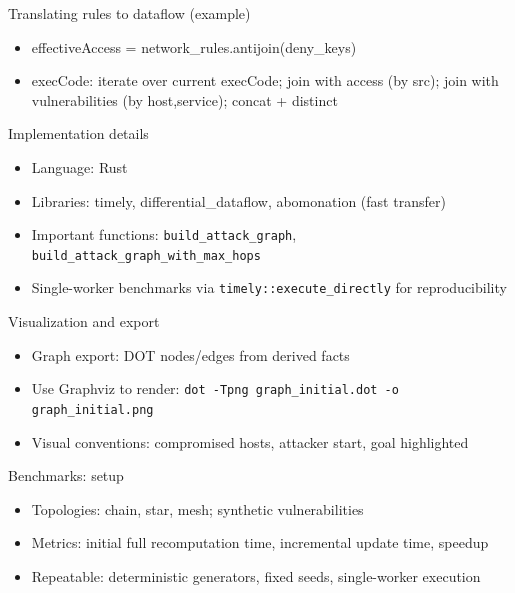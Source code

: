 \documentclass[professionalfonts]{beamer}
\begin{document}
\begin{frame}{Translating rules to dataflow (example)}
  \begin{itemize}
    \item effectiveAccess = network_rules.antijoin(deny_keys)
    \item execCode: iterate over current execCode; join with access (by src); join with vulnerabilities (by host,service); concat + distinct
  \end{itemize}
\end{frame}

\begin{frame}{Implementation details}
  \begin{itemize}
    \item Language: Rust
    \item Libraries: timely, differential_dataflow, abomonation (fast transfer)
    \item Important functions: \texttt{build_attack_graph}, \texttt{build_attack_graph_with_max_hops}
    \item Single-worker benchmarks via \texttt{timely::execute_directly} for reproducibility
  \end{itemize}
\end{frame}

\begin{frame}{Visualization and export}
  \begin{itemize}
    \item Graph export: DOT nodes/edges from derived facts
    \item Use Graphviz to render: \texttt{dot -Tpng graph_initial.dot -o graph_initial.png}
    \item Visual conventions: compromised hosts, attacker start, goal highlighted
  \end{itemize}
\end{frame}

\begin{frame}{Benchmarks: setup}
  \begin{itemize}
    \item Topologies: chain, star, mesh; synthetic vulnerabilities
    \item Metrics: initial full recomputation time, incremental update time, speedup
    \item Repeatable: deterministic generators, fixed seeds, single-worker execution
  \end{itemize}
\end{frame}
\end{document}
